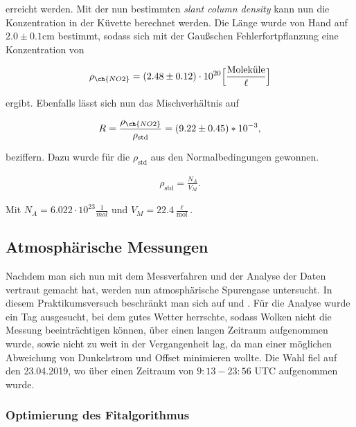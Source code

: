 \documentclass[12pt, a4paper, bibliography=totoc]{scrartcl}
\begin{document}
\begin{multicols}{2}
erreicht werden.
Mit der nun bestimmten \textit{slant column density} kann nun die  Konzentration in der Küvette berechnet werden.
Die Länge wurde von Hand auf $2.0 \pm 0.1$\si{cm} bestimmt, sodass sich mit der Gaußschen Fehlerfortpflanzung eine Konzentration von

\begin{align}
    \rho_{\ch{NO2}} = (2.48 \pm 0.12) \cdot 10^{20} \Bigl[ \frac{\text{Moleküle}}{\ell}\Bigr]
\end{align}

ergibt.	
Ebenfalls lässt sich nun das Mischverhältnis auf

\begin{align}
    R = \frac{\rho_{\ch{NO2}}}{\rho_{\text{std}}} = (9.22 \pm 0.45) *10^{-3},
\end{align}

beziffern. Dazu wurde für die $\rho_{\text{std}}$ aus den Normalbedingungen gewonnen.

\begin{align}
    \rho_{\text{std}} = \frac{N_A}{V_M}.
\end{align}
 	
Mit $N_A = 6.022 \cdot 10^{23} \frac{1}{\si{mol}}$ und $V_M = 22.4 \frac{\ell}{\si{\mol}}$.

\subsection{Atmosphärische Messungen}\label{ssec:atmospheric_measurements}

Nachdem man sich nun mit dem Messverfahren und der Analyse der Daten vertraut gemacht hat, werden nun atmosphärische Spurengase untersucht. In diesem Praktikumsversuch beschränkt man sich auf  und .
Für die Analyse wurde ein Tag ausgesucht, bei dem gutes Wetter herrschte, sodass Wolken nicht die Messung beeinträchtigen können, über einen langen Zeitraum aufgenommen wurde, sowie nicht zu weit in der Vergangenheit lag, da man einer möglichen Abweichung von Dunkelstrom und Offset minimieren wollte.
Die Wahl fiel auf den 23.04.2019, wo über einen Zeitraum von $9:13 - 23:56$ UTC aufgenommen wurde.

\subsubsection{Optimierung des Fitalgorithmus}\label{sssec:configure_fit}


\end{multicols}
\end{document}

